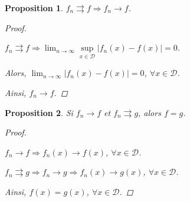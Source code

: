 \documentclass{report}
\newcommand*{\dlim}[3]{\displaystyle\lim_{#1 \to #2}#3}
\newcommand*{\abs}[1]{\left| #1 \right|}
\newcommand*{\convuni}{\rightrightarrows}
\newtheorem*{prop}{Proposition}
\theoremstyle{definition}
\theoremstyle{remark}
\begin{document}
	\begin{prop}
		$f_n \convuni f \Rightarrow f_n \to f$.
		\begin{proof}~

			$f_n \convuni f \Rightarrow \dlim{n}{\infty}{\sup\limits_{x \in \mathcal{D}}\abs{f_n(x)-f(x)}}=0$.

			Alors, $\dlim{n}{\infty}{\abs{f_n(x)-f(x)}}=0$, $\forall x \in \mathcal{D}$.

			Ainsi, $f_n \to f$.
		\end{proof}
	\end{prop}
	\begin{prop}
		Si $f_n \to f$ et $f_n \convuni g$, alors $f=g$.
		\begin{proof}~

			$f_n \to f \Rightarrow f_n(x) \to f(x)$, $\forall x \in \mathcal{D}$.

			$f_n \convuni g \Rightarrow f_n \to g \Rightarrow f_n(x) \to g(x)$, $\forall x \in \mathcal{D}$.

			Ainsi, $f(x)=g(x)$, $\forall x \in \mathcal{D}$.
		\end{proof}
	\end{prop}
\end{document}
